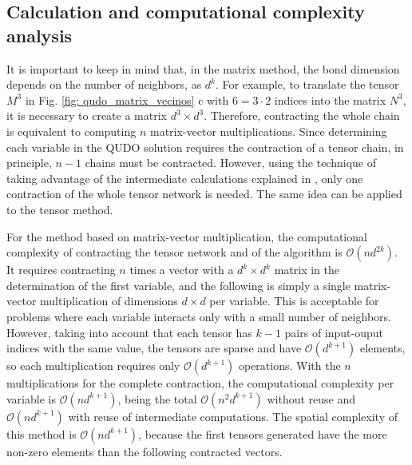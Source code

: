 \documentclass[%
 reprint,
 amsmath,amssymb,
 aps,
 pra,showkeys,
]{revtex4-2}
\begin{document}
\subsection{Calculation and computational complexity analysis}\label{ssec:kneigh complexity}
It is important to keep in mind that, in the matrix method, the bond dimension depends on the number of neighbors, as $d^{k}$. For example, to translate the tensor $M^3$ in Fig. \ref{fig: qudo_matrix_vecinos} c with $6 = 3 \cdot 2$ indices into the matrix $N^3$, it is necessary to create a matrix $d^3 \times d^3$. Therefore, contracting the whole chain is equivalent to computing $n$ matrix-vector multiplications. Since determining each variable in the QUDO solution requires the contraction of a tensor chain, in principle, $n-1$ chains must be contracted. However, using the technique of taking advantage of the intermediate calculations explained in \cite{melocoton, TSP_TN}, only one contraction of the whole tensor network is needed. The same idea can be applied to the tensor method.

For the method based on matrix-vector multiplication, the computational complexity of contracting the tensor network and of the algorithm is $\mathcal{O}(nd^{2k})$.  It requires contracting $n$ times a vector with a $d^k\times d^k$ matrix in the determination of the first variable, and the following is simply a single matrix-vector multiplication of dimensions $d\times d$ per variable. This is acceptable for problems where each variable interacts only with a small number of neighbors. However, taking into account that each tensor has $k-1$ pairs of input-ouput indices with the same value, the tensors are sparse and have $\mathcal{O}(d^{k+1})$ elements, so each multiplication requires only $\mathcal{O}(d^{k+1})$ operations. With the $n$ multiplications for the complete contraction, the computational complexity per variable is $\mathcal{O}(nd^{k+1})$, being the total $\mathcal{O}(n^2d^{k+1})$ without reuse and $\mathcal{O}(nd^{k+1})$ with reuse of intermediate computations. The spatial complexity of this method is $\mathcal{O}(nd^{k+1})$, because the first tensors generated have the more non-zero elements than the following contracted vectors.
\end{document}

